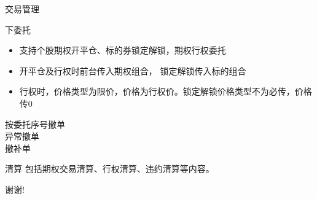 \documentclass[12pt]{ctexbeamer}	%
\begin{document}
\begin{frame}{交易管理}
  \begin{block}{下委托}
    \begin{itemize}
      \item 支持个股期权开平仓、标的券锁定解锁，期权行权委托
      \item 开平仓及行权时前台传入期权组合， 锁定解锁传入标的组合
      \item 行权时，价格类型为限价，价格为行权价。锁定解锁价格类型不为必传，价格传0
    \end{itemize}
  \end{block}
  按委托序号撤单\\
  异常撤单\\
  撤补单\\
\end{frame}

\begin{frame}{清算}
  包括期权交易清算、行权清算、违约清算等内容。
\end{frame}


\begin{frame}
\centerline{\Large 谢谢!}
\end{frame}
\end{document}
